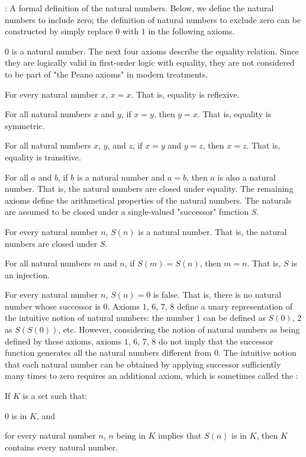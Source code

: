 \documentclass[a4paper,12pt]{article}
\begin{document}
: A formal definition of the natural numbers. Below, we define the natural numbers to include zero; the definition of natural numbers to exclude zero can be constructed by simply replace $0$ with $1$ in the following axioms.
\bit
\item $0$ is a natural number.
\eit
The next four axioms describe the equality relation. Since they are logically valid in first-order logic with equality, they are not considered to be part of "the Peano axioms" in modern treatments.
\bit
\item For every natural number $x$, $x=x$. That is, equality is reflexive.
\item For all natural numbers $x$ and $y$, if $x=y$, then $y=x$. That is, equality is symmetric.
\item For all natural numbers $x$, $y$, and $z$, if $x=y$ and $y=z$, then $x=z$. That is, equality is transitive.
\item For all $a$ and $b$, if $b$ is a natural number and $a=b$, then $a$ is also a natural number. That is, the natural numbers are closed under equality.
\eit
The remaining axioms define the arithmetical properties of the natural numbers. The naturals are assumed to be closed under a single-valued "successor" function $S$.
\bit
\item For every natural number $n$, $S(n)$ is a natural number. That is, the natural numbers are closed under $S$.
\item For all natural numbers $m$ and $n$, if $S(m)=S(n)$, then $m=n$. That is, $S$ is an injection.
\item For every natural number $n$, $S(n)=0$ is false. That is, there is no natural number whose successor is $0$.
\eit
Axioms $1$, $6$, $7$, $8$ define a unary representation of the intuitive notion of natural numbers: the number $1$ can be defined as $S(0)$, $2$ as $S(S(0))$, etc. However, considering the notion of natural numbers as being defined by these axioms, axioms $1$, $6$, $7$, $8$ do not imply that the successor function generates all the natural numbers different from $0$. The intuitive notion that each natural number can be obtained by applying successor sufficiently many times to zero requires an additional axiom, which is sometimes called the :
\bit
\item If $K$ is a set such that:
\bit
\item[] $0$ is in $K$, and
\item[] for every natural number $n$, $n$ being in $K$ implies that $S(n)$ is in $K$,
\eit
then $K$ contains every natural number.
\eit
\end{document}
